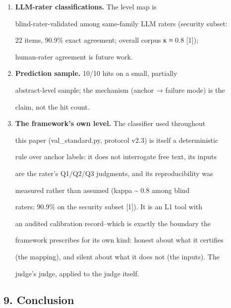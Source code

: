 \documentclass[

]{article}
\begin{document}
\begin{enumerate}
  utility coverage (long-horizon tasks, tool-calling convenience) is

  untested.

\item

  \textbf{LLM-rater classifications.} The level map is

  blind-rater-validated among same-family LLM raters (security subset:

  22 items, 90.9\% exact agreement; overall corpus κ ≈ 0.8 {[}1{]});

  human-rater agreement is future work.

\item

  \textbf{Prediction sample.} 10/10 hits on a small, partially

  abstract-level sample; the mechanism (anchor → failure mode) is the

  claim, not the hit count.

\item

  \textbf{The framework's own level.} The classifier used throughout

  this paper (val\_standard.py, protocol v2.3) is itself a deterministic

  rule over anchor labels: it does not interrogate free text, its inputs

  are the rater's Q1/Q2/Q3 judgments, and its reproducibility was

  measured rather than assumed (kappa \textasciitilde{} 0.8 among blind

  raters; 90.9\% on the security subset {[}1{]}). It is an L1 tool with

  an audited calibration record--which is exactly the boundary the

  framework prescribes for its own kind: honest about what it certifies

  (the mapping), and silent about what it does not (the inputs). The

  judge's judge, applied to the judge itself.

\end{enumerate}



\subsection{9. Conclusion}\label{conclusion}
\end{document}
